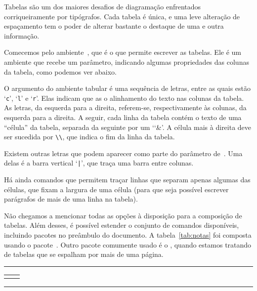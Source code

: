 Tabelas são um dos maiores desafios de diagramação enfrentados
corriqueiramente por tipógrafos. Cada tabela é única, e uma leve
alteração de espaçamento tem o poder de alterar bastante o destaque de
uma e outra informação.

Comecemos pelo ambiente~, que é o que permite
escrever as tabelas. Ele é um ambiente que recebe um parâmetro,
indicando algumas propriedades das colunas da tabela, como podemos ver abaixo.

O argumento do ambiente tabular é uma sequência de letras, entre as
quais estão `{\tt c}', `{\tt l}' e `{\tt r}'. Elas indicam que as
o alinhamento do texto nas colunas da tabela. As letras, da esquerda
para a direita, referem-se, respectivamente às colunas, da esquerda
para a direita. A seguir, cada linha da tabela contém o texto de uma
``célula'' da tabela, separada da seguinte por um `\char`\&'. A célula
mais à direita deve ser sucedida por \verb'\\', que indica o fim da
linha da tabela.

Existem outras letras que podem aparecer como parte do parâmetro
de~. Uma delas é a barra vertical `{\tt |}', que
traça uma barra entre colunas. 

Há ainda comandos que permitem traçar linhas que separam apenas algumas das
células, que fixam a largura de uma célula (para que seja possível
escrever parágrafos de mais de uma linha na tabela). 

Não chegamos a mencionar todas as opções à disposição para a
composição de tabelas. Além desses, é possível estender o conjunto de
comandos disponíveis, incluindo pacotes no preâmbulo do documento. A
tabela~\ref{tab:notas} foi composta usando o
pacote~. Outro pacote comumente usado é o
, quando estamos tratando de tabelas que se espalham
por mais de uma página.

\medskip
\begin{center}\hrule\smallskip
\begin{tabular}{c|c}
\begin{minipage}{.405\textwidth}\footnotesize

\end{minipage} &
\begin{minipage}{.535\textwidth}

\end{minipage}
\end{tabular}
\smallskip\hrule
\end{center}
\medskip



